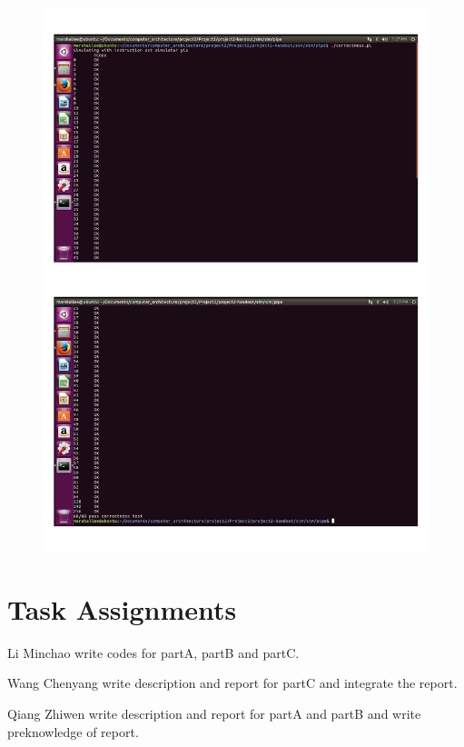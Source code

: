 \documentclass[12pt,a4paper]{article}
\theoremstyle{definition}
\numberwithin{equation}{section}
\numberwithin{figure}{section}
\begin{document}
\begin{figure}[H]
	\centering
	\includegraphics[width=12cm]{ncopy_correctness.pdf}
\end{figure}

\section{Task Assignments}

Li Minchao write codes for partA, partB and partC.

Wang Chenyang write description and report for partC and integrate the report.

Qiang Zhiwen write description and report for partA and partB and write preknowledge of report.
\end{document}
